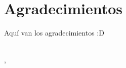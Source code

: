 \ifspanish
\else
\fi

%
%
\cleardoublepage
{} %

\chapter*{Agradecimientos} %

Aquí van los agradecimientos :D

\makeatletter		
\begin{flushright}
	\vspace{1,5cm}
	\textit{\@autor}\\
	\@lugarDef, \@yearDef
\end{flushright}
\makeatother
